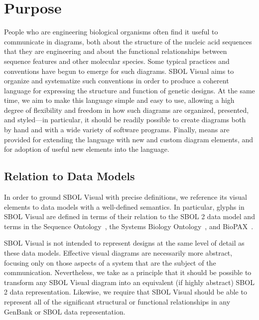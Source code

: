\section{Purpose}

People who are engineering biological organisms often find it useful to communicate in
diagrams, both about the structure of the nucleic acid sequences that they are engineering 
and about the functional relationships between sequence features and other molecular species.
%
Some typical practices and conventions have begun to emerge for such
diagrams.  SBOL Visual aims to organize and systematize such
conventions in order to produce a coherent language for expressing
the structure and function 
of genetic designs. 
%
At the same time, we aim to make this language simple and easy to use,
allowing a high degree of flexibility and freedom in how such diagrams are organized, presented, and
styled---in particular, it should be readily possible to create
diagrams both by hand and with a wide variety of software programs.
%
Finally, means are provided for extending the language with new and
custom diagram elements, and for adoption of useful new elements into
the language.

\subsection{Relation to Data Models}

In order to ground SBOL Visual with precise definitions, we reference its visual elements to data models with a well-defined semantics.
In particular, glyphs in SBOL Visual are defined in terms of their relation to the SBOL 2 data model and terms in the Sequence Ontology~\citep{SequenceOntology},
the Systems Biology Ontology~\citep{SBO}, and BioPAX~\citep{BioPAX}.

SBOL Visual is not intended to represent designs at the same level of detail as these data models.
Effective visual diagrams are necessarily more abstract, focusing only on those aspects of a system that are the subject of the communication.
Nevertheless, we take as a principle that it should be possible to transform any SBOL Visual diagram into an equivalent (if highly abstract) SBOL 2 data representation.
Likewise, we require that SBOL Visual should be able to represent all of the significant structural or functional relationships in any GenBank or SBOL data representation.

